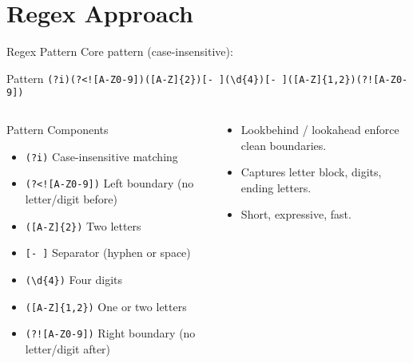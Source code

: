 \documentclass[aspectratio=169]{beamer}
\begin{document}
\section{Regex Approach}

\begin{frame}[fragile]{Regex Pattern}
  Core pattern (case-insensitive):
  \begin{block}{Pattern}
  \small\verb|(?i)(?<![A-Z0-9])([A-Z]{2})[- ](\d{4})[- ]([A-Z]{1,2})(?![A-Z0-9])|
  \end{block}
  \begin{columns}[T,totalwidth=\textwidth]
      \begin{column}{0.65\textwidth}
        \begin{block}{Pattern Components}
          \small
          \begin{itemize}
            \item \texttt{(?i)} Case-insensitive matching
            \item \texttt{(?<![A-Z0-9])} Left boundary (no letter/digit before)
            \item \texttt{([A-Z]\{2\})} Two letters
            \item \texttt{[- ]} Separator (hyphen or space)
            \item \texttt{(\textbackslash d\{4\})} Four digits
            \item \texttt{([A-Z]\{1,2\})} One or two letters
            \item \texttt{(?![A-Z0-9])} Right boundary (no letter/digit after)
          \end{itemize}
        \end{block}
    \end{column}
    \begin{column}{0.35\textwidth}
      \begin{itemize}
        \vspace{2em}

        \item Lookbehind / lookahead enforce clean boundaries.
        \item Captures letter block, digits, ending letters.
        \item Short, expressive, fast.
      \end{itemize}
    \end{column}
  \end{columns}
\end{frame}
\end{document}
